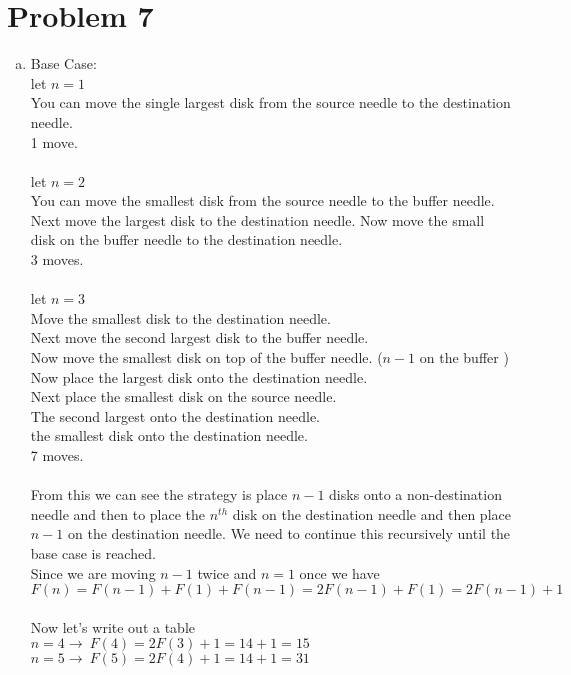 \documentclass[11pt,letterpaper]{article}
\begin{document}
\section*{Problem 7}
\begin{enumerate}[(a)]
\item
Base Case:\\
let $n = 1$\\
You can move the single largest disk from the source needle to the destination needle.\\
1 move.\\
\\
let $n = 2$\\
You can move the smallest disk from the source needle to the buffer needle.
Next move the largest disk to the destination needle.
Now move the small disk on the buffer needle to the destination needle.\\
3 moves.\\
\\
let $n = 3$\\
Move the smallest disk to the destination needle.\\
Next move the second largest disk to the buffer needle. \\
Now move the smallest disk on top of the buffer needle. ($n-1$ on the buffer )\\
Now place the largest disk onto the destination needle.\\
Next place the smallest disk on the source needle.\\
The second largest onto the destination needle.\\
the smallest disk onto the destination needle.\\
7 moves.\\\\
From this we can see the strategy is place $n-1$ disks onto a non-destination needle and then to place the $n^{th}$ disk on the destination needle and then place $n-1$ on the destination needle. We need to continue this recursively until the base case is reached.\\
Since we are moving $n-1$ twice and $n=1$ once we have\\
$F(n) = F(n-1) + F(1)+ F(n-1) = 2F(n-1) + F(1) = 2F(n-1) + 1$\\
\\
Now let's write out a table\\
$n=4\rightarrow~F(4) = 2F(3) + 1 = 14+1=15$\\
$n=5\rightarrow~F(5) = 2F(4) + 1 = 14+1=31$\\

\end{enumerate}
\end{document}
